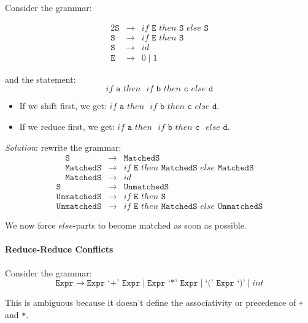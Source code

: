 \documentclass[twocolumn,english]{article}
\begin{document}
Consider the grammar:

\begin{alignat*}{2}
\texttt{S} & \rightarrow & if\texttt{ E }then\texttt{ S }else\texttt{ S}\\
\texttt{S} & \rightarrow & if\texttt{ E }then\texttt{ S}\\
\texttt{S} & \rightarrow & id\\
\texttt{E} & \rightarrow & 0\mid1
\end{alignat*}

and the statement:
\[
if\texttt{ a }then\texttt{ }if\texttt{ b }then\texttt{ c }else\texttt{ d}
\]

\begin{itemize}
\item If we shift first, we get: $if\texttt{ a }then\texttt{ }\boxed{if\texttt{ b }then\texttt{ c }else\texttt{ d}}$.
\item If we reduce first, we get: $if\texttt{ a }then\texttt{ }\boxed{if\texttt{ b }then\texttt{ c}}\texttt{ }else\texttt{ d}$.
\end{itemize}
\emph{Solution}: rewrite the grammar:
\begin{align*}
\texttt{S} & \rightarrow & \texttt{MatchedS}\\
\texttt{MatchedS} & \rightarrow & if\texttt{ E }then\texttt{ MatchedS }else\texttt{ MatchedS}\\
\texttt{MatchedS} & \rightarrow & id
\end{align*}
\begin{align*}
\texttt{S} & \rightarrow & \texttt{UnmatchedS}\\
\texttt{UnmatchedS} & \rightarrow & if\texttt{ E }then\texttt{ S}\\
\texttt{UnmatchedS} & \rightarrow & if\texttt{ E }then\texttt{ MatchedS }else\texttt{ UnmatchedS}
\end{align*}

We now force $else$-parts to become matched as soon as possible.

\paragraph{Reduce-Reduce Conflicts}

Consider the grammar:
\[
\texttt{Expr}\rightarrow\texttt{Expr `+' Expr}\mid\texttt{Expr `*' Expr}\mid\texttt{`(' Expr `)'}\mid int
\]

This is ambiguous because it doesn't define the associativity or precedence
of \texttt{+} and \texttt{{*}}.
\end{document}

